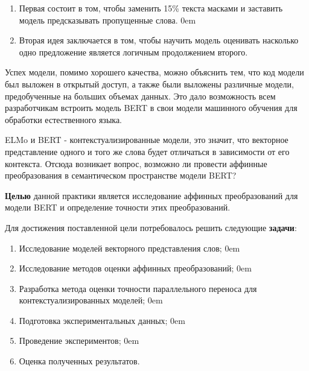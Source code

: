\documentclass[a4paper,14pt]{article}
\begin{document}
\begin{enumerate}
	\itemsep0em 
	\item Первая состоит в том, чтобы заменить 15\% текста масками и заставить модель предсказывать пропущенные слова.
	\itemsep0em 
	\item Вторая идея заключается в том, чтобы научить модель оценивать насколько одно предложение является логичным продолжением второго.
\end{enumerate}

Успех модели, помимо хорошего качества, можно объяснить тем, что код модели был выложен в открытый доступ, а также были выложены различные модели, предобученные на больших объемах данных.
Это дало возможность всем разработчикам встроить модель BERT в свои модели машинного обучения для обработки естественного языка.

ELMo и BERT - контекстуализированные модели, это значит, что векторное представление одного и того же слова будет отличаться в зависимости от его контекста.
Отсюда возникает вопрос, возможно ли провести аффинные преобразования в семантическом пространстве модели BERT?

\textbf{Целью} данной практики является исследование аффинных преобразований для модели BERT и определение точности этих преобразований.

Для достижения поставленной цели потребовалось решить следующие \textbf{задачи}:

\begin{enumerate}
	\itemsep0em 
	\item Исследование моделей векторного представления слов;
		\itemsep0em 
	\item Исследование методов оценки аффинных преобразований;
		\itemsep0em 
	\item Разработка метода оценки точности параллельного переноса для контекстуализированных моделей;
		\itemsep0em 
	\item Подготовка экспериментальных данных;
		\itemsep0em 
	\item Проведение экспериментов;
		\itemsep0em 
	\item Оценка полученных результатов.

\end{enumerate}
\end{document}

